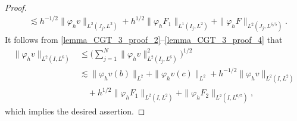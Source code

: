 \documentclass[10pt%
]{amsart}
\numberwithin{equation}{section}
\theoremstyle{definition}
\begin{document}
\begin{proof}
\begin{align}
		\nonumber
		&\lesssim h^{-1/2}\|\varphi_h v\|_{L^2(J_j,L^2)}+h^{1/2}\|\varphi_hF_1\|_{L^1(I_j,L^2)}+\|\varphi_hF\|_{L^2(J_j,L^{6/5})}. 
	\end{align}
	It follows from \eqref{lemma_CGT_3_proof_2}--\eqref{lemma_CGT_3_proof_4} that
	\begin{align*}
		\|\varphi_h v\|_{L^2(I,L^6)}
		&\le \Big(\sum_{j=1}^N\|\varphi_h v\|_{L^2(I_j,L^6)}^2\Big)^{1/2}\\
		&\lesssim \|\varphi_h v(b)\|_{L^2}+\|\varphi_h v(c)\|_{L^2}+h^{-1/2}\|\varphi_hv\|_{L^2(I,L^2)}\\
		&\quad+h^{1/2}\|\varphi_hF_1\|_{L^2(I,L^2)}+\|\varphi_hF_2\|_{L^2(I,L^{6/5})},
	\end{align*}
	which implies the desired assertion. 
\end{proof}
\end{document}
